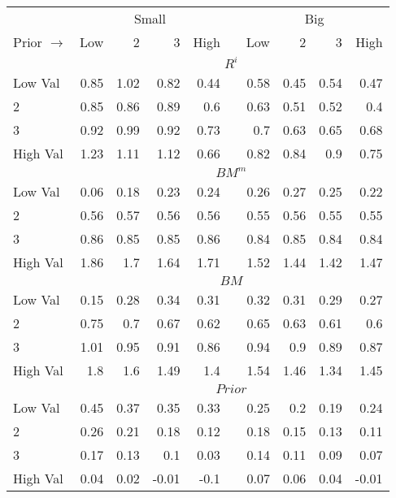 
\begin{tabular}{lrrrrlrrrr}
  \toprule
    & \multicolumn{4}{c}{Small} & & \multicolumn{4}{c}{Big} \\
      \cmidrule(r){2-5} \cmidrule(r){7-10}
  Prior $\rightarrow$ & Low & 2 & 3 & High & & Low & 2 & 3 & High \\ 
  \midrule
  

    & \multicolumn{9}{c}{$R^i$} \\
    Low Val    & 0.85  & 1.02  & 0.82  & 0.44  & & 0.58  & 0.45  & 0.54  & 0.47  \\
           2   & 0.85  & 0.86  & 0.89  & 0.6  & & 0.63  & 0.51  & 0.52  & 0.4  \\
           3   & 0.92  & 0.99  & 0.92  & 0.73  & & 0.7  & 0.63  & 0.65  & 0.68  \\
    High Val   & 1.23  & 1.11  & 1.12  & 0.66  & & 0.82  & 0.84  & 0.9  & 0.75  \\
    [1em]
  

    & \multicolumn{9}{c}{$BM^m$} \\
    Low Val    & 0.06  & 0.18  & 0.23  & 0.24  & & 0.26  & 0.27  & 0.25  & 0.22  \\
           2   & 0.56  & 0.57  & 0.56  & 0.56  & & 0.55  & 0.56  & 0.55  & 0.55  \\
           3   & 0.86  & 0.85  & 0.85  & 0.86  & & 0.84  & 0.85  & 0.84  & 0.84  \\
    High Val   & 1.86  & 1.7  & 1.64  & 1.71  & & 1.52  & 1.44  & 1.42  & 1.47  \\
    [1em]
  

    & \multicolumn{9}{c}{$BM$} \\
    Low Val    & 0.15  & 0.28  & 0.34  & 0.31  & & 0.32  & 0.31  & 0.29  & 0.27  \\
           2   & 0.75  & 0.7  & 0.67  & 0.62  & & 0.65  & 0.63  & 0.61  & 0.6  \\
           3   & 1.01  & 0.95  & 0.91  & 0.86  & & 0.94  & 0.9  & 0.89  & 0.87  \\
    High Val   & 1.8  & 1.6  & 1.49  & 1.4  & & 1.54  & 1.46  & 1.34  & 1.45  \\
    [1em]
  

    & \multicolumn{9}{c}{$Prior$} \\
    Low Val    & 0.45  & 0.37  & 0.35  & 0.33  & & 0.25  & 0.2  & 0.19  & 0.24  \\
           2   & 0.26  & 0.21  & 0.18  & 0.12  & & 0.18  & 0.15  & 0.13  & 0.11  \\
           3   & 0.17  & 0.13  & 0.1  & 0.03  & & 0.14  & 0.11  & 0.09  & 0.07  \\
    High Val   & 0.04  & 0.02  & -0.01  & -0.1  & & 0.07  & 0.06  & 0.04  & -0.01  \\
    [1em]
  


\end{tabular}
